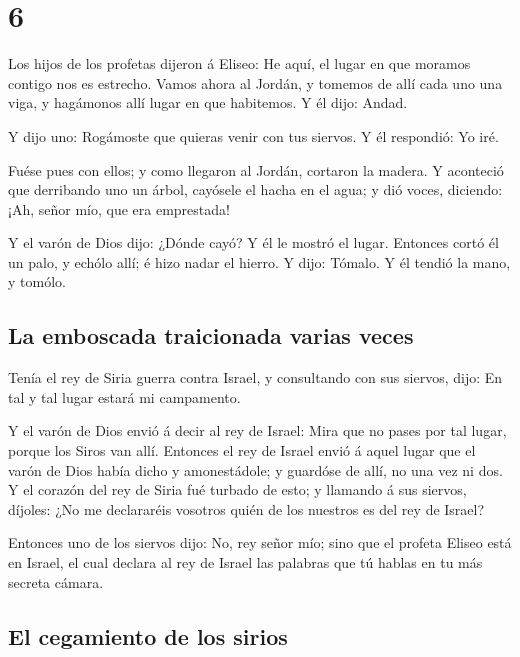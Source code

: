 \hypertarget{section-5}{%
\section{6}\label{section-5}}

 Los hijos de los profetas dijeron á Eliseo: He aquí, el
lugar en que moramos contigo nos es estrecho.  Vamos ahora
al Jordán, y tomemos de allí cada uno una viga, y hagámonos allí lugar
en que habitemos. Y él dijo: Andad.

 Y dijo uno: Rogámoste que quieras venir con tus siervos.
Y él respondió: Yo iré.

 Fuése pues con ellos; y como llegaron al Jordán, cortaron
la madera.  Y aconteció que derribando uno un árbol,
cayósele el hacha en el agua; y dió voces, diciendo: ¡Ah, señor mío, que
era emprestada!

 Y el varón de Dios dijo: ¿Dónde cayó? Y él le mostró el
lugar. Entonces cortó él un palo, y echólo allí; é hizo nadar el hierro.
 Y dijo: Tómalo. Y él tendió la mano, y tomólo.

\hypertarget{la-emboscada-traicionada-varias-veces}{%
\subsection{La emboscada traicionada varias
veces}\label{la-emboscada-traicionada-varias-veces}}

 Tenía el rey de Siria guerra contra Israel, y consultando
con sus siervos, dijo: En tal y tal lugar estará mi campamento.

 Y el varón de Dios envió á decir al rey de Israel: Mira
que no pases por tal lugar, porque los Siros van allí. 
Entonces el rey de Israel envió á aquel lugar que el varón de Dios había
dicho y amonestádole; y guardóse de allí, no una vez ni dos.
 Y el corazón del rey de Siria fué turbado de esto; y
llamando á sus siervos, díjoles: ¿No me declararéis vosotros quién de
los nuestros es del rey de Israel?

 Entonces uno de los siervos dijo: No, rey señor mío;
sino que el profeta Eliseo está en Israel, el cual declara al rey de
Israel las palabras que tú hablas en tu más secreta cámara.

\hypertarget{el-cegamiento-de-los-sirios}{%
\subsection{El cegamiento de los
sirios}\label{el-cegamiento-de-los-sirios}}

